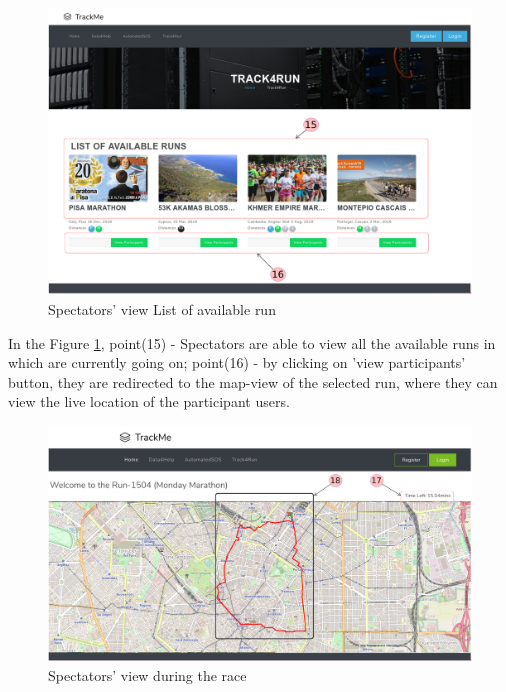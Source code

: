 \documentclass[a4paper, hidelinks, 12pt]{report}
\begin{document}
	\begin{figure}[H]
		\centering
		\includegraphics[width=1\textwidth]{Diagrams/ui/spectators_events.png}\caption[UI: Spectators' view List of available run]{Spectators' view List of available run}
		\label{fig:t4r_list_of_available_run}
	\end{figure}
	
	In the Figure \ref{fig:t4r_list_of_available_run}, point(15) - Spectators are able to view all the available runs in which are currently going on; point(16) - by clicking on 'view participants' button, they are redirected to the map-view of the selected run, where they can view the live location of the participant users. 
	
	\begin{figure}[H]
		\centering
		\includegraphics[width=1\textwidth]{Diagrams/ui/spectators_watch_event.png}\caption[UI: Spectators' view during the race]{Spectators' view during the race}
		\label{fig:spectators_valid_race}
	\end{figure}
	
\end{document}
